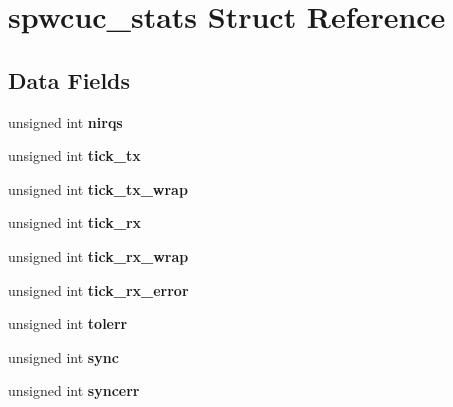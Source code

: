 \hypertarget{structspwcuc__stats}{}\section{spwcuc\+\_\+stats Struct Reference}
\label{structspwcuc__stats}
\subsection*{Data Fields}
\begin{DoxyCompactItemize}
\item 
\mbox{\label{structspwcuc__stats_a536c9fdca059c7dffd8c12efa07b4d0e}} 
unsigned int {\bfseries nirqs}
\item 
\mbox{\label{structspwcuc__stats_a4627a6ff2f02d56fdaca5ec1fb9bb330}} 
unsigned int {\bfseries tick\+\_\+tx}
\item 
\mbox{\label{structspwcuc__stats_a956408cf6fcb8546f3046c4e16edb644}} 
unsigned int {\bfseries tick\+\_\+tx\+\_\+wrap}
\item 
\mbox{\label{structspwcuc__stats_a8f7b8432177a8f66aa6318fad61f9d64}} 
unsigned int {\bfseries tick\+\_\+rx}
\item 
\mbox{\label{structspwcuc__stats_aa7628226e5549347db798da3792e58a5}} 
unsigned int {\bfseries tick\+\_\+rx\+\_\+wrap}
\item 
\mbox{\label{structspwcuc__stats_a9096d8b5db9190db4a12fd2ed89816de}} 
unsigned int {\bfseries tick\+\_\+rx\+\_\+error}
\item 
\mbox{\label{structspwcuc__stats_a34802f15a38c152e5a419745e9515e03}} 
unsigned int {\bfseries tolerr}
\item 
\mbox{\label{structspwcuc__stats_a4f1523cee627de2dac3336a3063e18bf}} 
unsigned int {\bfseries sync}
\item 
\mbox{\label{structspwcuc__stats_a5abc68326a23c94c86e0662d82d5265d}} 
unsigned int {\bfseries syncerr}
\item 

\end{DoxyCompactItemize}
